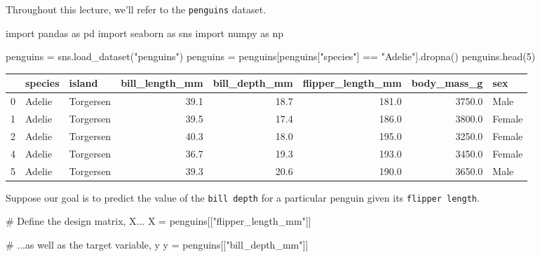 \documentclass[
  letterpaper,
  DIV=11,
  numbers=noendperiod]{scrreprt}
\newenvironment{Shaded}{\begin{snugshade}}{\end{snugshade}}
\newcommand{\CommentTok}[1]{\textcolor[rgb]{0.37,0.37,0.37}{#1}}
\newcommand{\DecValTok}[1]{\textcolor[rgb]{0.68,0.00,0.00}{#1}}
\newcommand{\ImportTok}[1]{\textcolor[rgb]{0.00,0.46,0.62}{#1}}
\newcommand{\NormalTok}[1]{\textcolor[rgb]{0.00,0.23,0.31}{#1}}
\newcommand{\OperatorTok}[1]{\textcolor[rgb]{0.37,0.37,0.37}{#1}}
\newcommand{\StringTok}[1]{\textcolor[rgb]{0.13,0.47,0.30}{#1}}
\begin{document}
Throughout this lecture, we'll refer to the \texttt{penguins} dataset.

\begin{Shaded}
\begin{Highlighting}[]
\ImportTok{import}\NormalTok{ pandas }\ImportTok{as}\NormalTok{ pd}
\ImportTok{import}\NormalTok{ seaborn }\ImportTok{as}\NormalTok{ sns}
\ImportTok{import}\NormalTok{ numpy }\ImportTok{as}\NormalTok{ np}

\NormalTok{penguins }\OperatorTok{=}\NormalTok{ sns.load\_dataset(}\StringTok{"penguins"}\NormalTok{)}
\NormalTok{penguins }\OperatorTok{=}\NormalTok{ penguins[penguins[}\StringTok{"species"}\NormalTok{] }\OperatorTok{==} \StringTok{"Adelie"}\NormalTok{].dropna()}
\NormalTok{penguins.head(}\DecValTok{5}\NormalTok{)}
\end{Highlighting}
\end{Shaded}

\begin{tabular}{lllrrrrl}
\toprule
{} & species &     island &  bill\_length\_mm &  bill\_depth\_mm &  flipper\_length\_mm &  body\_mass\_g &     sex \\
\midrule
0 &  Adelie &  Torgersen &            39.1 &           18.7 &              181.0 &       3750.0 &    Male \\
1 &  Adelie &  Torgersen &            39.5 &           17.4 &              186.0 &       3800.0 &  Female \\
2 &  Adelie &  Torgersen &            40.3 &           18.0 &              195.0 &       3250.0 &  Female \\
4 &  Adelie &  Torgersen &            36.7 &           19.3 &              193.0 &       3450.0 &  Female \\
5 &  Adelie &  Torgersen &            39.3 &           20.6 &              190.0 &       3650.0 &    Male \\
\bottomrule
\end{tabular}

Suppose our goal is to predict the value of the
\texttt{\textquotesingle{}bill\ depth\textquotesingle{}} for a
particular penguin given its
\texttt{\textquotesingle{}flipper\ length\textquotesingle{}}.

\begin{Shaded}
\begin{Highlighting}[]
\CommentTok{\# Define the design matrix, X...}
\NormalTok{X }\OperatorTok{=}\NormalTok{ penguins[[}\StringTok{"flipper\_length\_mm"}\NormalTok{]]}

\CommentTok{\# ...as well as the target variable, y}
\NormalTok{y }\OperatorTok{=}\NormalTok{ penguins[[}\StringTok{"bill\_depth\_mm"}\NormalTok{]]}
\end{Highlighting}
\end{Shaded}
\end{document}
